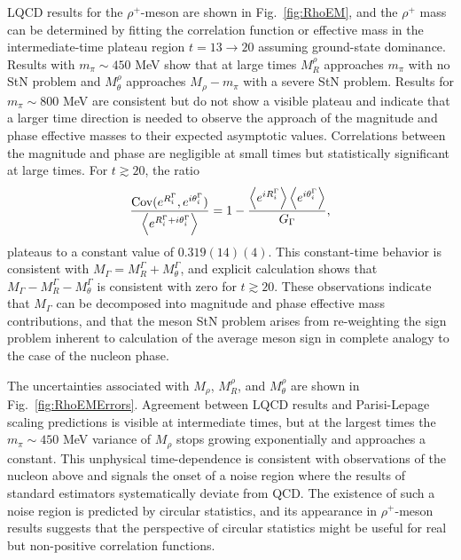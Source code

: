 LQCD results for the $\rho^+$-meson are shown in Fig.~\ref{fig:RhoEM}, and the $\rho^+$ mass can be determined by fitting the correlation function or effective mass in the intermediate-time plateau region $t=13\rightarrow 20$ assuming ground-state dominance.
Results with $m_\pi \sim 450$ MeV show that at large times $M_R^\rho$ approaches $m_\pi$ with no StN problem and $M_\theta^\rho$ approaches $M_\rho - m_\pi$ with a severe StN problem.
Results for $m_\pi \sim 800$ MeV are consistent but do not show a visible plateau and indicate that a larger time direction is needed to observe the approach of the magnitude and phase effective masses to their expected asymptotic values.
Correlations between the magnitude and phase are negligible at small times but statistically significant at large times.
For $t \gtrsim 20$, the ratio
\begin{equation}
  \begin{split}
    \frac{\text{Cov}(e^{R_i^\Gamma},e^{i\theta_i^\Gamma})}{\left< e^{R_i^\Gamma + i \theta_i^\Gamma} \right>} = 1 - \frac{\left< e^{iR_i^\Gamma} \right>\left< e^{i\theta^\Gamma_i} \right>}{G_\Gamma},
  \end{split}\label{eq:magphasecov}
\end{equation}
plateaus to a constant value of $0.319(14)(4)$.
This constant-time behavior is consistent with $M_\Gamma = M_R^\Gamma + M_\theta^\Gamma$, and explicit calculation shows that $M_\Gamma - M_R^\Gamma - M_\theta^\Gamma$ is consistent with zero for $t \gtrsim 20$.
These observations indicate that $M_\Gamma$ can be decomposed into magnitude and phase effective mass contributions, and that the meson StN problem arises from re-weighting the sign problem inherent to calculation of the average meson sign in complete analogy to the case of the nucleon phase.

The uncertainties associated with $M_\rho$, $M_R^\rho$, and $M_\theta^\rho$ are shown in Fig.~\ref{fig:RhoEMErrors}.
Agreement between LQCD results and Parisi-Lepage scaling predictions is visible at intermediate times,
but at the largest times the $m_\pi \sim 450$ MeV variance of $M_\rho$ stops growing exponentially and approaches a constant.
This unphysical time-dependence is consistent with observations of the nucleon above
and signals the onset of a noise region where the results of standard estimators systematically deviate from QCD.
The existence of such a noise region is predicted by circular statistics,
and its appearance in $\rho^+$-meson results suggests that the perspective of circular statistics might be useful for real but non-positive correlation functions.

